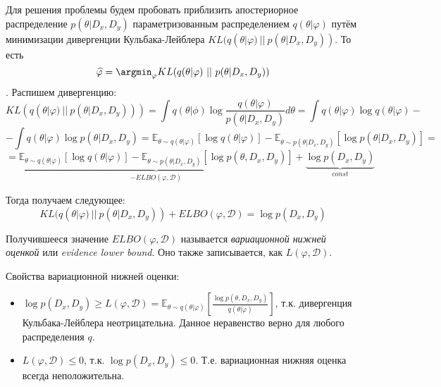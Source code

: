 Для решения проблемы будем пробовать приблизить апостериорное распределение $p(\theta | D_x, D_y)$ параметризованным распределением $q(\theta | \varphi)$ путём минимизации дивергенции Кульбака-Лейблера $KL(q(\theta | \varphi)\ ||\ p(\theta | D_x, D_y))$.
 То есть
$$\widehat{\varphi} = \argmin_{\varphi} KL(q(\theta | \varphi)\ ||\ p(\theta | D_x, D_y))$$.
Распишем дивергенцию:
$$KL(q(\theta | \varphi)\ ||\ p(\theta | D_x, D_y))) = \int q(\theta | \phi) \log \frac{q(\theta | \varphi)}{p(\theta | D_x, D_y)} d\theta = \int q(\theta | \varphi) \log q(\theta | \varphi)-$$
$$-\int q(\theta | \varphi) \log p(\theta | D_x, D_y) = \mathbb{E}_{\theta \sim q(\theta | \varphi)} [\log q(\theta | \varphi)] - \mathbb{E}_{\theta \sim p(\theta | D_x, D_y)}[\log p(\theta | D_x, D_y)]=$$
$$=\underbrace{\mathbb{E}_{\theta \sim q(\theta | \varphi)} [\log q(\theta | \varphi)] - \mathbb{E}_{\theta \sim p(\theta | D_x, D_y)}[\log p(\theta, D_x, D_y)] }_{-ELBO(\varphi, \mathcal{D})} + \underbrace{\log p(D_x, D_y)}_{const}$$

Тогда получаем следующее:
$$KL(q(\theta | \varphi)\ ||\ p(\theta | D_x, D_y)) + ELBO(\varphi, \mathcal{D}) = \log p(D_x, D_y)$$

Получившееся значение $ELBO(\varphi, \mathcal{D})$ называется \textit{вариационной нижней оценкой} или \textit{evidence lower bound}. Оно также записывается,
 как $L(\varphi, \mathcal{D})$.

Свойства вариационной нижней оценки:
\begin{itemize}
    \item $\log p(D_x, D_y) \ge L(\varphi, \mathcal{D}) = \mathbb{E}_{\theta \sim q(\theta | \varphi)} [\frac{\log p(\theta, D_x, D_y)}{q(\theta | \varphi)}]$, т.к. дивергенция Кульбака-Лейблера неотрицательна. Данное неравенство верно для любого распределения $q$.
    \item $L(\varphi, \mathcal{D}) \le 0$, т.к. $\log p(D_x, D_y) \le 0$. Т.е. вариационная нижняя оценка всегда неположительна.
\end{itemize}

